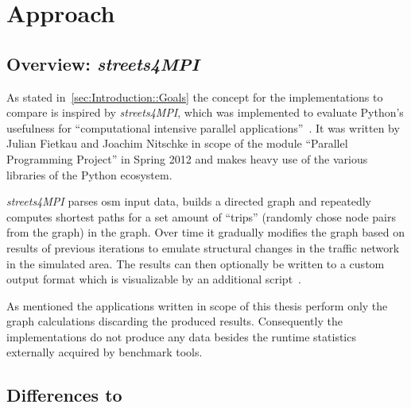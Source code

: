 \chapter{Approach}
\label{ch:Approach}


\section{Overview: \textit{streets4MPI}}
\label{sec:Approach::Overview}

As stated in~\autoref{sec:Introduction::Goals} the concept for the implementations to compare is inspired by \textit{streets4MPI}, which was implemented to evaluate Python's usefulness for ``computational intensive parallel applications''~\cite[p.3]{streets_report}. It was written by Julian Fietkau and Joachim Nitschke in scope of the module ``Parallel Programming Project'' in Spring 2012 and makes heavy use of the various libraries of the Python ecosystem.

\textit{streets4MPI} parses \gls{osm} input data, builds a directed graph and repeatedly computes shortest paths for a set amount of ``trips'' (randomly chose node pairs from the graph) in the graph. Over time it gradually modifies the graph based on results of previous iterations to emulate structural changes in the traffic network in the simulated area. The results can then optionally be written to a custom output format which is visualizable by an additional script~\cite{streets_report}.

As mentioned the applications written in scope of this thesis perform only the graph calculations discarding the produced results. Consequently the implementations do not produce any data besides the runtime statistics externally acquired by benchmark tools.


\section{Differences to }
\label{sec:Approach::Differences}


